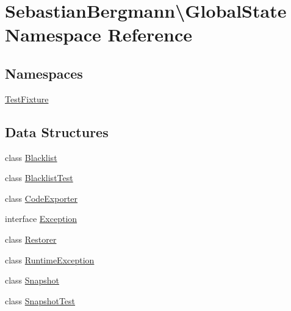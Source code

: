 \hypertarget{namespace_sebastian_bergmann_1_1_global_state}{}\section{Sebastian\+Bergmann\textbackslash{}Global\+State Namespace Reference}
\label{namespace_sebastian_bergmann_1_1_global_state}
\subsection*{Namespaces}
\begin{DoxyCompactItemize}
\item 
 \mbox{\hyperlink{namespace_sebastian_bergmann_1_1_global_state_1_1_test_fixture}{Test\+Fixture}}
\end{DoxyCompactItemize}
\subsection*{Data Structures}
\begin{DoxyCompactItemize}
\item 
class \mbox{\hyperlink{class_sebastian_bergmann_1_1_global_state_1_1_blacklist}{Blacklist}}
\item 
class \mbox{\hyperlink{class_sebastian_bergmann_1_1_global_state_1_1_blacklist_test}{Blacklist\+Test}}
\item 
class \mbox{\hyperlink{class_sebastian_bergmann_1_1_global_state_1_1_code_exporter}{Code\+Exporter}}
\item 
interface \mbox{\hyperlink{interface_sebastian_bergmann_1_1_global_state_1_1_exception}{Exception}}
\item 
class \mbox{\hyperlink{class_sebastian_bergmann_1_1_global_state_1_1_restorer}{Restorer}}
\item 
class \mbox{\hyperlink{class_sebastian_bergmann_1_1_global_state_1_1_runtime_exception}{Runtime\+Exception}}
\item 
class \mbox{\hyperlink{class_sebastian_bergmann_1_1_global_state_1_1_snapshot}{Snapshot}}
\item 
class \mbox{\hyperlink{class_sebastian_bergmann_1_1_global_state_1_1_snapshot_test}{Snapshot\+Test}}
\end{DoxyCompactItemize}
